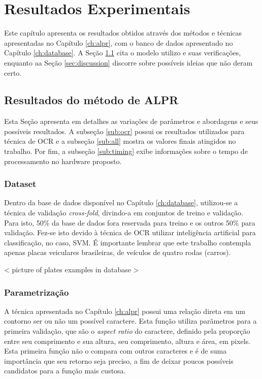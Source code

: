 \chapter{Resultados Experimentais}
\label{ch:experimental}

Este capítulo apresenta os resultados obtidos através dos métodos e técnicas apresentadas no Capítulo \ref{ch:alpr}, com o banco de dados apresentado no Capítulo \ref{ch:database}. A Seção \ref{sec:resultsalpr} cita o modelo utilizo e suas verificações, enquanto aa Seção \ref{sec:discussion} discorre sobre possíveis ideias que não deram certo.

\section{Resultados do método de ALPR}
\label{sec:resultsalpr}

Esta Seção apresenta em detalhes as variações de parâmetros e abordagens e seus possíveis resultados. A subseção \ref{sub:ocr} possui os resultados utilizados para técnica de OCR e a subseção \ref{sub:all} mostra os valores finais atingidos no trabalho. Por fim, a subseção \ref{sub:timing} exibe informações sobre o tempo de processamento no hardware proposto.

\subsection{Dataset}

Dentro da base de dados disponível no Capítulo \ref{ch:database}, utilizou-se a técnica de validação \textit{cross-fold}, divindo-a em conjuntos de treino e validação. Para isto, 50\% da base de dados fora reservada para treino e os outros 50\% para validação. Fez-se isto devido à técnica de OCR utilizar inteligência artificial para classificação, no caso, SVM. É importante lembrar que este trabalho contempla apenas placas veiculares brasileiras, de veículos de quatro rodas (carros).

< picture of plates examples in database >

\subsection{Parametrização}

A técnica apresentada no Capítulo \ref{ch:alpr} possui uma relação direta em um contorno ser ou não um possível caractere. Esta função utiliza parâmetros para a primeira validação, que são o \textit{aspect ratio} do caractere, definido pela proporção entre seu comprimento e sua altura, seu comprimento, altura e área, em pixels. Esta primeira função não o compara com outros caracteres e é de suma importância que seu retorno seja preciso, a fim de deixar poucos possíveis candidatos para a função mais custosa.

